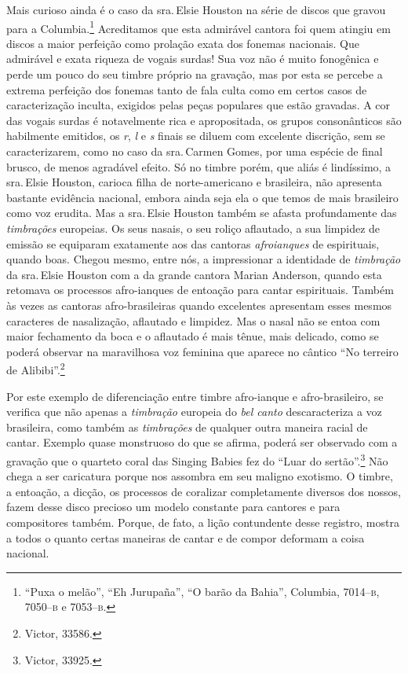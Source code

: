 Mais curioso ainda é o caso da sra.\,Elsie Houston na série de discos que
gravou para a Columbia.\footnote{``Puxa o melão'', ``Eh Jurupaña'', ``O barão da
Bahia'', Columbia, 7014--\textsc{b}, 7050--\textsc{b} e 7053--\textsc{b}.} Acreditamos que esta
admirável cantora foi quem atingiu em discos a maior perfeição como
prolação exata dos fonemas nacionais. Que admirável e exata riqueza de
vogais surdas! Sua voz não é muito fonogênica e perde um pouco do seu
timbre próprio na gravação, mas por esta se percebe a extrema perfeição
dos fonemas tanto de fala culta como em certos casos de caracterização
inculta, exigidos pelas peças populares que estão gravadas. A cor das
vogais surdas é notavelmente rica e apropositada, os grupos
consonânticos são habilmente emitidos, os \textit{r}, \textit{l} e \textit{s} finais se diluem com
excelente discrição, sem se caracterizarem, como no caso da sra.\,Carmen
Gomes, por uma espécie de final brusco, de menos agradável efeito. Só no
timbre porém, que aliás é lindíssimo, a sra.\,Elsie Houston, carioca
filha de norte-americano e brasileira, não apresenta bastante evidência
nacional, embora ainda seja ela o que temos de mais brasileiro como voz
erudita. Mas a sra.\,Elsie Houston também se afasta profundamente das
\textit{timbrações} europeias. Os seus nasais, o seu roliço aflautado, a sua
limpidez de emissão se equiparam exatamente aos das cantoras \textit{afroianques}
de espirituais, quando boas. Chegou mesmo, entre nós, a impressionar a
identidade de \textit{timbração} da sra.\,Elsie Houston com a da grande cantora
Marian Anderson, quando esta retomava os processos afro-ianques de
entoação para cantar espirituais. Também às vezes as cantoras
afro-brasileiras quando excelentes apresentam esses mesmos caracteres de
nasalização, aflautado e limpidez. Mas o nasal não se entoa com maior
fechamento da boca e o aflautado é mais tênue, mais delicado, como se
poderá observar na maravilhosa voz feminina que aparece no cântico ``No
terreiro de Alibibi''.\footnote{Victor, 33586.}

Por este exemplo de diferenciação entre timbre afro-ianque e
afro-brasileiro, se verifica que não apenas a \textit{timbração} europeia do \textit{bel
canto} descaracteriza a voz brasileira, como também as \textit{timbrações} de
qualquer outra maneira racial de cantar. Exemplo quase monstruoso do que
se afirma, poderá ser observado com a gravação que o quarteto coral das
Singing Babies fez do ``Luar do sertão''.\footnote{Victor, 33925.} Não chega a
ser caricatura porque nos assombra em seu maligno exotismo. O timbre, a
entoação, a dicção, os processos de coralizar completamente diversos dos
nossos, fazem desse disco precioso um modelo constante para cantores e
para compositores também. Porque, de fato, a lição contundente desse
registro, mostra a todos o quanto certas maneiras de cantar e de compor
deformam a coisa nacional.

